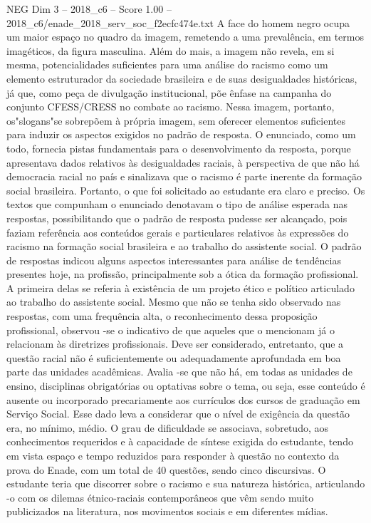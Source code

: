 \begin{textsample}{NEG Dim 3 – 2018\_c6 – Score 1.00 – 2018\_c6/enade\_2018\_serv\_soc\_f2ecfc474e.txt}
A face do homem negro ocupa um maior espaço no quadro da imagem, remetendo a uma prevalência, em termos imagéticos, da figura masculina.
Além do mais, a imagem não revela, em si mesma, potencialidades suficientes para uma análise do racismo como um elemento estruturador da sociedade brasileira e de suas desigualdades históricas, já que, como peça de divulgação institucional, põe ênfase na campanha do conjunto CFESS/CRESS no combate ao racismo.
Nessa imagem, portanto, os"slogans"se sobrepõem à própria imagem, sem oferecer elementos suficientes para induzir os aspectos exigidos no padrão de resposta.
O enunciado, como um todo, fornecia pistas fundamentais para o desenvolvimento da resposta, porque apresentava dados relativos às desigualdades raciais, à perspectiva de que não há democracia racial no país e sinalizava que o racismo é parte inerente da formação social brasileira.
Portanto, o que foi solicitado ao estudante era claro e preciso.
Os textos que compunham o enunciado denotavam o tipo de análise esperada nas respostas, possibilitando que o padrão de resposta pudesse ser alcançado, pois faziam referência aos conteúdos gerais e particulares relativos às expressões do racismo na formação social brasileira e ao trabalho do assistente social.
O padrão de respostas indicou alguns aspectos interessantes para análise de tendências presentes hoje, na profissão, principalmente sob a ótica da formação profissional.
A primeira delas se referia à existência de um projeto ético e político articulado ao trabalho do assistente social.
Mesmo que não se tenha sido observado nas respostas, com uma frequência alta, o reconhecimento dessa proposição profissional, observou -se o indicativo de que aqueles que o mencionam já o relacionam às diretrizes profissionais.
Deve ser considerado, entretanto, que a questão racial não é suficientemente ou adequadamente aprofundada em boa parte das unidades acadêmicas.
Avalia -se que não há, em todas as unidades de ensino, disciplinas obrigatórias ou optativas sobre o tema, ou seja, esse conteúdo é ausente ou incorporado precariamente aos currículos dos cursos de graduação em Serviço Social.
Esse dado leva a considerar que o nível de exigência da questão era, no mínimo, médio.
O grau de dificuldade se associava, sobretudo, aos conhecimentos requeridos e à capacidade de síntese exigida do estudante, tendo em vista espaço e tempo reduzidos para responder à questão no contexto da prova do Enade, com um total de 40 questões, sendo cinco discursivas.
O estudante teria que discorrer sobre o racismo e sua natureza histórica, articulando -o com os dilemas étnico-raciais contemporâneos que vêm sendo muito publicizados na literatura, nos movimentos sociais e em diferentes mídias.

\end{textsample}

